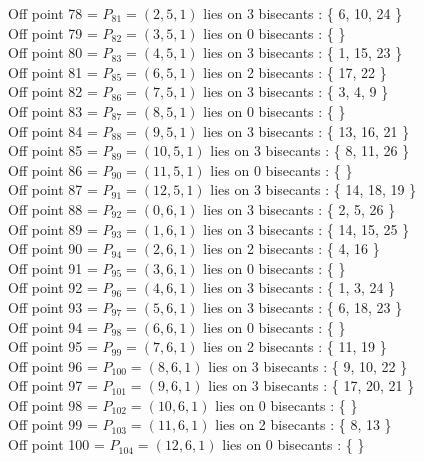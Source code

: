 \documentclass{article}
\begin{document}
{Off point 78 = $P_{81} = ( 2, 5, 1 )$ lies on 3 bisecants : \{ 6, 10, 24 \}\\
Off point 79 = $P_{82} = ( 3, 5, 1 )$ lies on 0 bisecants : \{  \}\\
Off point 80 = $P_{83} = ( 4, 5, 1 )$ lies on 3 bisecants : \{ 1, 15, 23 \}\\
Off point 81 = $P_{85} = ( 6, 5, 1 )$ lies on 2 bisecants : \{ 17, 22 \}\\
Off point 82 = $P_{86} = ( 7, 5, 1 )$ lies on 3 bisecants : \{ 3, 4, 9 \}\\
Off point 83 = $P_{87} = ( 8, 5, 1 )$ lies on 0 bisecants : \{  \}\\
Off point 84 = $P_{88} = ( 9, 5, 1 )$ lies on 3 bisecants : \{ 13, 16, 21 \}\\
Off point 85 = $P_{89} = ( 10, 5, 1 )$ lies on 3 bisecants : \{ 8, 11, 26 \}\\
Off point 86 = $P_{90} = ( 11, 5, 1 )$ lies on 0 bisecants : \{  \}\\
Off point 87 = $P_{91} = ( 12, 5, 1 )$ lies on 3 bisecants : \{ 14, 18, 19 \}\\
Off point 88 = $P_{92} = ( 0, 6, 1 )$ lies on 3 bisecants : \{ 2, 5, 26 \}\\
Off point 89 = $P_{93} = ( 1, 6, 1 )$ lies on 3 bisecants : \{ 14, 15, 25 \}\\
Off point 90 = $P_{94} = ( 2, 6, 1 )$ lies on 2 bisecants : \{ 4, 16 \}\\
Off point 91 = $P_{95} = ( 3, 6, 1 )$ lies on 0 bisecants : \{  \}\\
Off point 92 = $P_{96} = ( 4, 6, 1 )$ lies on 3 bisecants : \{ 1, 3, 24 \}\\
Off point 93 = $P_{97} = ( 5, 6, 1 )$ lies on 3 bisecants : \{ 6, 18, 23 \}\\
Off point 94 = $P_{98} = ( 6, 6, 1 )$ lies on 0 bisecants : \{  \}\\
Off point 95 = $P_{99} = ( 7, 6, 1 )$ lies on 2 bisecants : \{ 11, 19 \}\\
Off point 96 = $P_{100} = ( 8, 6, 1 )$ lies on 3 bisecants : \{ 9, 10, 22 \}\\
Off point 97 = $P_{101} = ( 9, 6, 1 )$ lies on 3 bisecants : \{ 17, 20, 21 \}\\
Off point 98 = $P_{102} = ( 10, 6, 1 )$ lies on 0 bisecants : \{  \}\\
Off point 99 = $P_{103} = ( 11, 6, 1 )$ lies on 2 bisecants : \{ 8, 13 \}\\
Off point 100 = $P_{104} = ( 12, 6, 1 )$ lies on 0 bisecants : \{  \}\\
}
\end{document}
